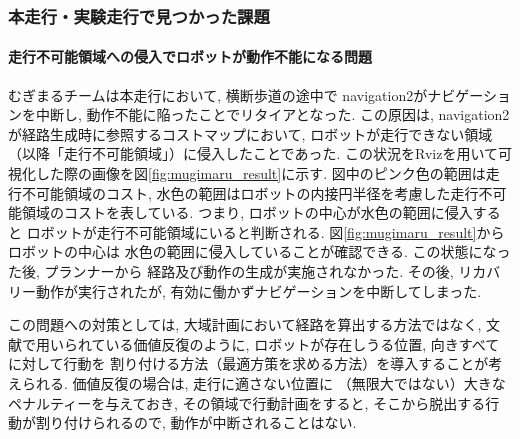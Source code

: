 \subsubsection{本走行・実験走行で見つかった課題}
\paragraph{走行不可能領域への侵入でロボットが動作不能になる問題}
むぎまるチームは本走行において, 横断歩道の途中で
navigation2がナビゲーションを中断し, 
動作不能に陥ったことでリタイアとなった. 
この原因は, navigation2が経路生成時に参照するコストマップにおいて, 
ロボットが走行できない領域（以降「走行不可能領域」）に侵入したことであった. 
この状況をRvizを用いて可視化した際の画像を図\ref{fig:mugimaru_result}に示す. 
図中のピンク色の範囲は走行不可能領域のコスト, 
水色の範囲はロボットの内接円半径を考慮した走行不可能領域のコストを表している. 
つまり, ロボットの中心が水色の範囲に侵入すると
ロボットが走行不可能領域にいると判断される. 
図\ref{fig:mugimaru_result}からロボットの中心は
水色の範囲に侵入していることが確認できる. 
この状態になった後, プランナーから
経路及び動作の生成が実施されなかった. 
その後, リカバリー動作が実行されたが, 
有効に働かずナビゲーションを中断してしまった. 

この問題への対策としては, 
大域計画において経路を算出する方法ではなく, 
文献\cite{ueda2023JRM}で用いられている価値反復のように, 
ロボットが存在しうる位置, 向きすべてに対して行動を
割り付ける方法（最適方策を求める方法）を導入することが考えられる. 
価値反復の場合は, 走行に適さない位置に
（無限大ではない）大きなペナルティーを与えておき, 
その領域で行動計画をすると, 
そこから脱出する行動が割り付けられるので, 
動作が中断されることはない. 




